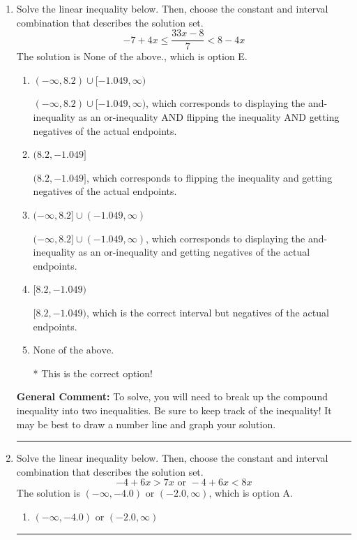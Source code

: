 \documentclass{extbook}[14pt]
\newcommand{\litem}[1]{\item #1

\rule{\textwidth}{0.4pt}}
\begin{document}
\begin{enumerate}
{\begin{enumerate}[label=\Alph*.]
 This describes the values more than 3 from 4
\item \( (-\infty, 1] \cup [7, \infty) \)

 This describes the values no less than 3 from 4
\item \( \text{None of the above} \)

 You likely thought the values in the interval were not correct.
\item \( (1, 7) \)

* This is the correct option!
\item \( [1, 7] \)

 This describes the values no more than 3 from 4
\end{enumerate}

\textbf{General Comment:} When thinking about this language, it helps to draw a number line and try points.
}
\litem{
Solve the linear inequality below. Then, choose the constant and interval combination that describes the solution set.
\[ -7 + 4 x \leq \frac{33 x - 8}{7} < 8 - 4 x \]The solution is \( \text{None of the above.} \), which is option E.\begin{enumerate}[label=\Alph*.]
\item \( (-\infty, 8.2) \cup [-1.049, \infty) \)

 $(-\infty, 8.2) \cup [-1.049, \infty)$, which corresponds to displaying the and-inequality as an or-inequality AND flipping the inequality AND getting negatives of the actual endpoints.
\item \( (8.2, -1.049] \)

 $(8.2, -1.049]$, which corresponds to flipping the inequality and getting negatives of the actual endpoints.
\item \( (-\infty, 8.2] \cup (-1.049, \infty) \)

 $(-\infty, 8.2] \cup (-1.049, \infty)$, which corresponds to displaying the and-inequality as an or-inequality and getting negatives of the actual endpoints.
\item \( [8.2, -1.049) \)

 $[8.2, -1.049)$, which is the correct interval but negatives of the actual endpoints.
\item \( \text{None of the above.} \)

* This is the correct option!
\end{enumerate}

\textbf{General Comment:} To solve, you will need to break up the compound inequality into two inequalities. Be sure to keep track of the inequality! It may be best to draw a number line and graph your solution.
}
\litem{
Solve the linear inequality below. Then, choose the constant and interval combination that describes the solution set.
\[ -4 + 6 x > 7 x \text{ or } -4 + 6 x < 8 x \]The solution is \( (-\infty, -4.0) \text{ or } (-2.0, \infty) \), which is option A.\begin{enumerate}[label=\Alph*.]
\item \( (-\infty, -4.0) \text{ or } (-2.0, \infty) \)


\end{enumerate}}
\end{enumerate}
\end{document}

